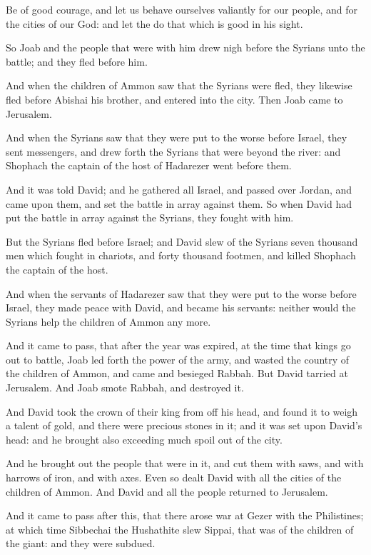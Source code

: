 \Verse Be of good courage, and let us behave ourselves valiantly for our people, and for the cities of our God: and let the \LORD do that which is good in his sight.

\Verse So Joab and the people that were with him drew nigh before the Syrians unto the battle; and they fled before him.

\Verse And when the children of Ammon saw that the Syrians were fled, they likewise fled before Abishai his brother, and entered into the city. Then Joab came to Jerusalem.

\Verse And when the Syrians saw that they were put to the worse before Israel, they sent messengers, and drew forth the Syrians that were beyond the river: and Shophach the captain of the host of Hadarezer went before them.

\Verse And it was told David; and he gathered all Israel, and passed over Jordan, and came upon them, and set the battle in array against them. So when David had put the battle in array against the Syrians, they fought with him.

\Verse But the Syrians fled before Israel; and David slew of the Syrians seven thousand men which fought in chariots, and forty thousand footmen, and killed Shophach the captain of the host.

\Verse And when the servants of Hadarezer saw that they were put to the worse before Israel, they made peace with David, and became his servants: neither would the Syrians help the children of Ammon any more.


\Chapter
\Verse And it came to pass, that after the year was expired, at the time that kings go out to battle, Joab led forth the power of the army, and wasted the country of the children of Ammon, and came and besieged Rabbah. But David tarried at Jerusalem. And Joab smote Rabbah, and destroyed it.

\Verse And David took the crown of their king from off his head, and found it to weigh a talent of gold, and there were precious stones in it; and it was set upon David's head: and he brought also exceeding much spoil out of the city.

\Verse And he brought out the people that were in it, and cut them with saws, and with harrows of iron, and with axes. Even so dealt David with all the cities of the children of Ammon. And David and all the people returned to Jerusalem.

\Verse And it came to pass after this, that there arose war at Gezer with the Philistines; at which time Sibbechai the Hushathite slew Sippai, that was of the children of the giant: and they were subdued.

